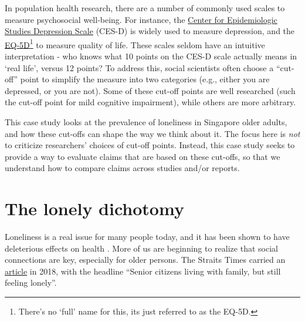 \documentclass[
  openany]{book}
\begin{document}
In population health research, there are a number of commonly used scales to measure psychosocial well-being. For instance, the \href{https://www.apa.org/pi/about/publications/caregivers/practice-settings/assessment/tools/depression-scale}{Center for Epidemiologic Studies Depression Scale} (CES-D) is widely used to measure depression, and the \href{https://euroqol.org/eq-5d-instruments/}{EQ-5D}\footnote{There's no `full' name for this, its just referred to as the EQ-5D.} to measure quality of life. These scales seldom have an intuitive interpretation - who knows what 10 points on the CES-D scale actually means in `real life', versus 12 points? To address this, social scientists often choose a ``cut-off'' point to simplify the measure into two categories (e.g., either you are depressed, or you are not). Some of these cut-off points are well researched (such the cut-off point for mild cognitive impairment), while others are more arbitrary.

This case study looks at the prevalence of loneliness in Singapore older adults, and how these cut-offs can shape the way we think about it. The focus here is \emph{not} to criticize researchers' choices of cut-off points. Instead, this case study seeks to provide a way to evaluate claims that are based on these cut-offs, so that we understand how to compare claims across studies and/or reports.

\hypertarget{the-lonely-dichotomy}{%
\section{The lonely dichotomy}\label{the-lonely-dichotomy}}

Loneliness is a real issue for many people today, and it has been shown to have deleterious effects on health \citep{rico-uribe_association_2018}. More of us are beginning to realize that social connections are key, especially for older persons. The Straits Times carried an \href{https://www.straitstimes.com/singapore/living-with-family-but-still-feeling-lonely}{article} in 2018, with the headline ``Senior citizens living with family, but still feeling lonely''.
\end{document}
